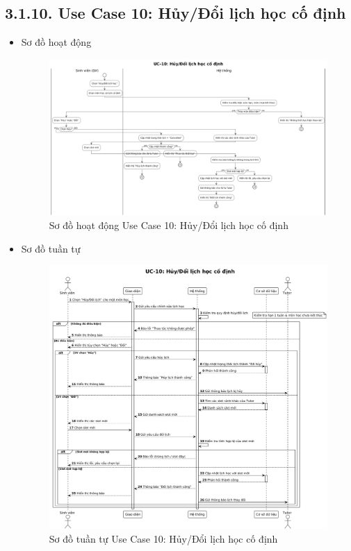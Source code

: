 \subsection*{3.1.10. Use Case 10: Hủy/Đổi lịch học cố định}
\begin{itemize}
    \item Sơ đồ hoạt động
    \begin{figure}[H]
    \centering
    \includegraphics[scale=0.28 ]{Picture/ACUC10.png}
    \caption{Sơ đồ hoạt động Use Case 10: Hủy/Đổi lịch học cố định}
    \end{figure}
    \item Sơ đồ tuần tự
    \begin{figure}[H]
    \centering
    \includegraphics[scale=0.35 ]{Picture/SEUC10.png}
    \caption{Sơ đồ tuần tự Use Case 10: Hủy/Đổi lịch học cố định}
    \end{figure}
\end{itemize}
